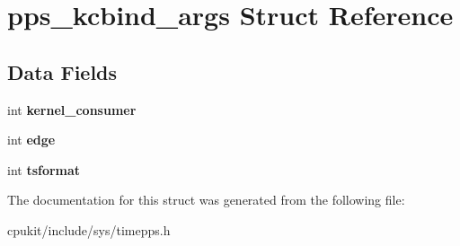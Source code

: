 \hypertarget{structpps__kcbind__args}{}\section{pps\+\_\+kcbind\+\_\+args Struct Reference}
\label{structpps__kcbind__args}
\subsection*{Data Fields}
\begin{DoxyCompactItemize}
\item 
\mbox{\label{structpps__kcbind__args_a63e883f3c06baeb26d5a2b74ef12761b}} 
int {\bfseries kernel\+\_\+consumer}
\item 
\mbox{\label{structpps__kcbind__args_a711a7b589ff23a7e0e7c1f123dd45b38}} 
int {\bfseries edge}
\item 
\mbox{\label{structpps__kcbind__args_ab6dde83e0aa22734f7b484e3bd76ede1}} 
int {\bfseries tsformat}
\end{DoxyCompactItemize}


The documentation for this struct was generated from the following file\+:\begin{DoxyCompactItemize}
\item 
cpukit/include/sys/timepps.\+h\end{DoxyCompactItemize}
